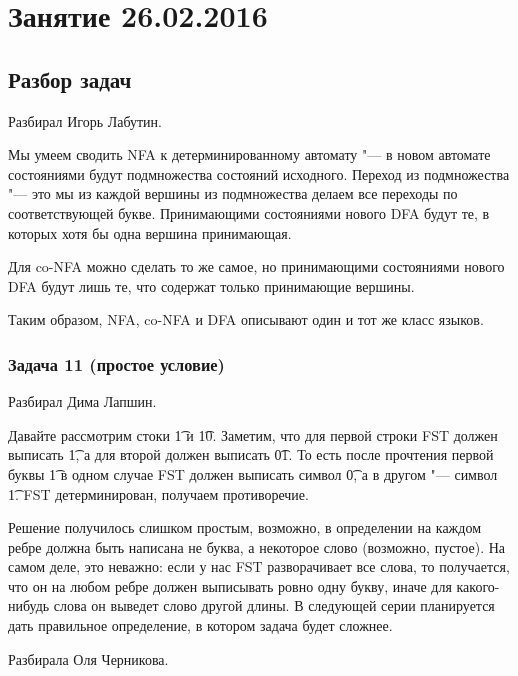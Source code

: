\chapter{Занятие 26.02.2016}
\section{Разбор задач}

	Разбирал Игорь Лабутин.

	Мы умеем сводить NFA к детерминированному автомату "--- в новом
	автомате состояниями будут подмножества состояний исходного.
	Переход из подмножества "--- это мы из каждой вершины из подмножества
	делаем все переходы по соответствующей букве.
	Принимающими состояниями нового DFA будут те, в которых хотя бы одна вершина принимающая.

	Для co-NFA можно сделать то же самое, но принимающими состояниями нового DFA
	будут лишь те, что содержат только принимающие вершины.

	Таким образом, NFA, co-NFA и DFA описывают один и тот же класс языков.

\subsection{Задача 11 (простое условие)}\label{prob11easy}
	Разбирал Дима Лапшин.

	Давайте рассмотрим стоки \t{1} и \t{10}.
	Заметим, что для первой строки FST должен выписать \t{1},
	а для второй должен выписать \t{01}.
	То есть после прочтения первой буквы \t{1} в одном случае FST
	должен выписать символ \t{0}, а в другом "--- символ \t{1}.
	FST детерминирован, получаем противоречие.

	Решение получилось слишком простым, возможно, в определении на каждом
	ребре должна быть написана не буква, а некоторое слово (возможно, пустое).
	На самом деле, это неважно: если у нас FST разворачивает все слова,
	то получается, что он на любом ребре должен выписывать ровно одну букву,
	иначе для какого-нибудь слова он выведет слово другой длины.
	В следующей серии планируется дать правильное определение, в котором задача будет сложнее.

	Разбирала Оля Черникова.

